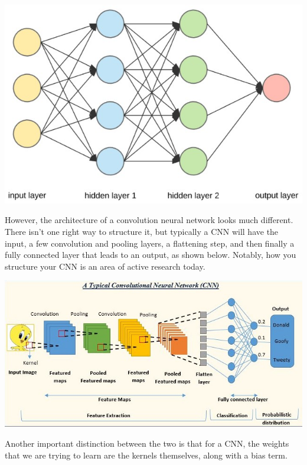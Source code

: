 \documentclass{article}
\begin{document}
        \begin{center}
            \includegraphics[scale=0.6]{images/NN.jpg}    
        \end{center}
        
        However, the architecture of a convolution neural network looks much different. There isn't one right way to structure it, but typically a CNN will have the input, a few convolution and pooling layers, a flattening step, and then finally a fully connected layer that leads to an output, as shown below. Notably, how you structure your CNN is an area of active research today.
        
        \begin{center}
            \includegraphics[scale=0.6]{images/CNN.jpg}
        \end{center}
        
        Another important distinction between the two is that for a CNN, the weights that we are trying to learn are the kernels themselves, along with a bias term.
\end{document}
